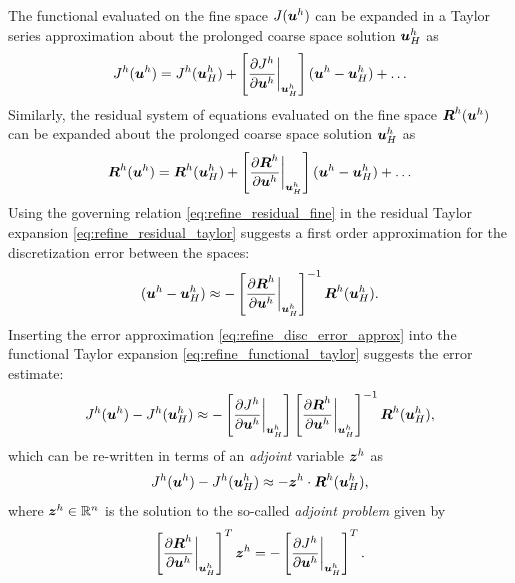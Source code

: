 The functional evaluated on the fine space $J(\boldsymbol{u}^h)$
can be expanded in a Taylor series approximation about the
prolonged coarse space solution $\boldsymbol{u}^h_H$ as
%
\begin{gather}
J^h(\boldsymbol{u}^h) = J^h(\boldsymbol{u}^h_H) +
\left[ \frac{\partial J^h}{\partial \boldsymbol{u}^h}
\biggr|_{\boldsymbol{u}^h_H} \right]
(\boldsymbol{u}^h - \boldsymbol{u}^h_H) + \dots
\label{eq:refine_functional_taylor}
\end{gather}
%
Similarly, the residual system of equations evaluated
on the fine space $\boldsymbol{R}^h(\boldsymbol{u}^h)$ can be expanded
about the prolonged coarse space solution $\boldsymbol{u}^h_H$ as
%
\begin{gather}
\boldsymbol{R}^h(\boldsymbol{u}^h) = \boldsymbol{R}^h(\boldsymbol{u}^h_H) +
\left[ \frac{\partial \boldsymbol{R}^h}{\partial \boldsymbol{u}^h}
\biggr|_{\boldsymbol{u}^h_H} \right]
(\boldsymbol{u}^h - \boldsymbol{u}^h_H) + \dots
\label{eq:refine_residual_taylor}
\end{gather}
%
Using the governing relation \eqref{eq:refine_residual_fine} in the
residual Taylor expansion \eqref{eq:refine_residual_taylor} suggests
a first order approximation for the discretization error between the
spaces:
%
\begin{gather}
(\boldsymbol{u}^h - \boldsymbol{u}^h_H) \approx
- \left[ \frac{\partial \boldsymbol{R}^h}{\partial \boldsymbol{u}^h}
\biggr|_{\boldsymbol{u}^h_H} \right]^{-1}
\boldsymbol{R}^h(\boldsymbol{u}^h_H).
\label{eq:refine_disc_error_approx}
\end{gather}
%
Inserting the error approximation \eqref{eq:refine_disc_error_approx}
into the functional Taylor expansion \eqref{eq:refine_functional_taylor}
suggests the error estimate:
%
\begin{gather}
J^h(\boldsymbol{u}^h) - J^h(\boldsymbol{u}^h_H) \approx
- \left[ \frac{\partial J^h}{\partial \boldsymbol{u}^h}
\biggr|_{\boldsymbol{u}^h_H} \right]
\left[ \frac{\partial \boldsymbol{R}^h}{\partial \boldsymbol{u}^h}
\biggr|_{\boldsymbol{u}^h_H} \right]^{-1}
\boldsymbol{R}^h(\boldsymbol{u}^h_H),
\end{gather}
%
which can be re-written in terms of an \emph{adjoint} variable
$\boldsymbol{z}^h$ as
%
\begin{gather}
J^h(\boldsymbol{u}^h) - J^h(\boldsymbol{u}^h_H) \approx
- \boldsymbol{z}^h \cdot \boldsymbol{R}^h (\boldsymbol{u}^h_H),
\label{eq:refine_adjoint_error}
\end{gather}
%
where $\boldsymbol{z}^h \in \mathbb{R}^n$ is the solution to the
so-called \emph{adjoint problem} given by
%
\begin{gather}
\left[ \frac{\partial \boldsymbol{R}^h}{\partial \boldsymbol{u}^h}
\biggr|_{\boldsymbol{u}^h_H} \right]^T
\boldsymbol{z}^h
=
- \left[ \frac{\partial J^h}{\partial \boldsymbol{u}^h}
\biggr|_{\boldsymbol{u}^h_H} \right]^T.
\label{eq:refine_adjoint_problem}
\end{gather}

